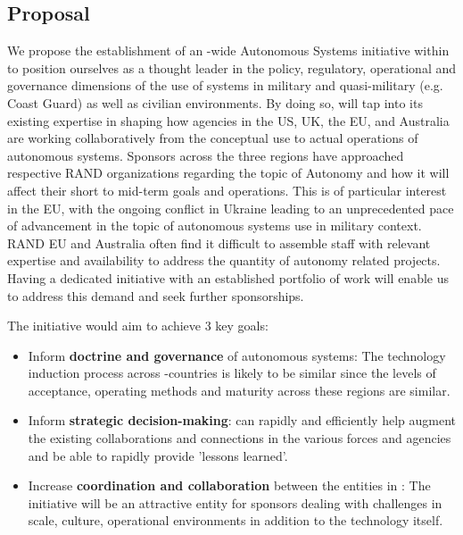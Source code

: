 \documentclass[11pt,letterpaper]{article}
\begin{document}
\subsection{Proposal}

We propose the establishment of an \auke-wide Autonomous Systems
initiative within \org to position ourselves as a thought leader in the
policy, regulatory, operational and governance dimensions of the use
of systems in military and quasi-military (e.g. Coast Guard) as well
as civilian environments. By doing so, \org will tap into its existing
expertise in shaping how agencies in the US, UK, the EU, and Australia
are working collaboratively from the conceptual use to actual
operations of autonomous systems. Sponsors across the three regions have approached respective RAND organizations regarding the topic of Autonomy and how it will affect their short to mid-term goals and operations. This is of particular interest in the EU, with the ongoing conflict in Ukraine leading to an unprecedented pace of advancement in the topic of autonomous systems use in military context. RAND EU and Australia often find it difficult to assemble staff with relevant expertise and availability to address the quantity of autonomy related projects. Having a dedicated initiative with an established portfolio of work will enable us to address this demand and seek further sponsorships. 

The initiative would aim to achieve 3 key goals: 

\begin{itemize}

\item Inform \textbf{doctrine and governance} of autonomous systems:
  The technology induction process across \auke-countries is likely to
  be similar since the levels of acceptance, operating methods and
  maturity across these regions are similar.

\item Inform \textbf{strategic decision-making}: \org can rapidly and
  efficiently help augment the existing collaborations and connections
  in the various forces and agencies and be able to rapidly provide
  ’lessons learned’.

\item Increase \textbf{coordination and collaboration} between the
  entities in \auke: The initiative will be an attractive entity for
  sponsors dealing with challenges in scale, culture, operational
  environments in addition to the technology itself.

\end{itemize}
\end{document}
